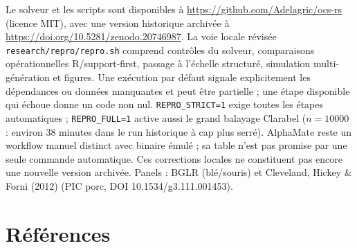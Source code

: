 \documentclass[11pt]{article}
\begin{document}
Le solveur et les scripts sont disponibles à \url{https://github.com/Adelagric/ocs-rs} (licence MIT), avec une version historique archivée à \url{https://doi.org/10.5281/zenodo.20746987}. La voie locale révisée \texttt{research/repro/repro.sh} comprend contrôles du solveur, comparaisons opérationnelles R/support-first, passage à l'échelle structuré, simulation multi-génération et figures. Une exécution par défaut signale explicitement les dépendances ou données manquantes et peut être partielle ; une étape disponible qui échoue donne un code non nul. \texttt{REPRO\_STRICT=1} exige toutes les étapes automatiques ; \texttt{REPRO\_FULL=1} active aussi le grand balayage Clarabel ($n=10000$ : environ 38 minutes dans le run historique à cap plus serré). AlphaMate reste un workflow manuel distinct avec binaire émulé ; sa table n'est pas promise par une seule commande automatique. Ces corrections locales ne constituent pas encore une nouvelle version archivée. Panels : BGLR (blé/souris) et Cleveland, Hickey \& Forni (2012) (PIC porc, DOI 10.1534/g3.111.001453).

\section*{Références}
\sloppy
\end{document}
